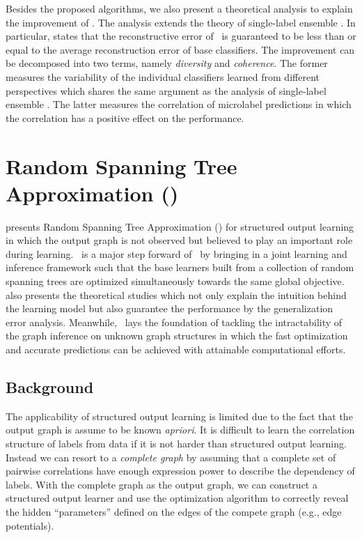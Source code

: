 {Besides the proposed algorithms, we also present a theoretical analysis to explain the improvement of \mam.
The analysis extends the theory of single-label ensemble \citep{Brown10good}.
In particular,  states that the reconstructive error of \mam\ is guaranteed to be less than or equal to the average reconstruction error of base classifiers.
The improvement can be decomposed into two terms, namely \textit{diversity} and \textit{coherence}.
The former measures the variability of the individual classifiers learned from different perspectives which shares the same argument as the analysis of single-label ensemble \citep{Brown10good}.
The latter measures the correlation of microlabel predictions in which the correlation has a positive effect on the performance. 


%
%
\section{Random Spanning Tree Approximation (\rta)}\label{sc_su14c}

 presents Random Spanning Tree Approximation (\rta) for structured output learning in which the output graph is not observed but believed to play an important role during learning.
\rta\ is a major step forward of \mam\ by bringing in a joint learning and inference framework such that the base learners built from a collection of random spanning trees are optimized simultaneously towards the same global objective.
 also presents the theoretical studies which not only explain the intuition behind the learning model but also guarantee the performance by the generalization error analysis.
Meanwhile, \rta\ lays the foundation of tackling the intractability of the graph inference on unknown graph structures in which the fast optimization and accurate predictions can be achieved with attainable computational efforts.



%
%
\subsection{Background}

The applicability of structured output learning is limited due to the fact that the output graph is assume to be known \textit{apriori}.
It is difficult to learn the correlation structure of labels from data \citep{Chickering94learning} if it is not harder than structured output learning.
Instead we can resort to a \textit{complete graph} by assuming that a complete set of pairwise correlations have enough expression power to describe the dependency of labels.
With the complete graph as the output graph, we can construct a structured output learner and use the optimization algorithm to correctly reveal the hidden ``parameters'' defined on the edges of the compete graph (e.g., edge potentials).

}
